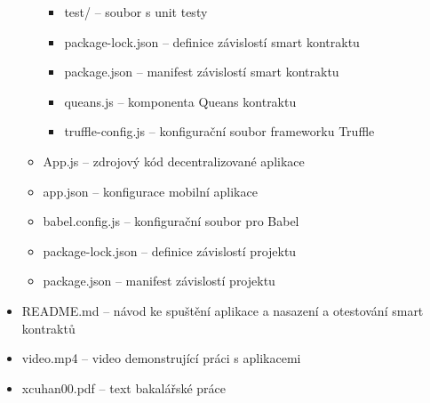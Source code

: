 \begin{itemize}
\begin{itemize}
\begin{itemize}
            \item test/ -- soubor s unit testy
            \item package-lock.json -- definice závislostí smart kontraktu
            \item package.json -- manifest závislostí smart kontraktu
            \item queans.js -- komponenta Queans kontraktu
            \item truffle-config.js -- konfigurační soubor frameworku Truffle
        \end{itemize}
        \item App.js -- zdrojový kód decentralizované aplikace
        \item app.json -- konfigurace mobilní aplikace
        \item babel.config.js -- konfigurační soubor pro Babel
        \item package-lock.json -- definice závislostí projektu
        \item package.json -- manifest závislostí projektu
    \end{itemize}
    \item README.md -- návod ke spuštění aplikace a nasazení a otestování smart kontraktů
    \item video.mp4 -- video demonstrující práci s aplikacemi
    \item xcuhan00.pdf -- text bakalářské práce

\end{itemize}




%
